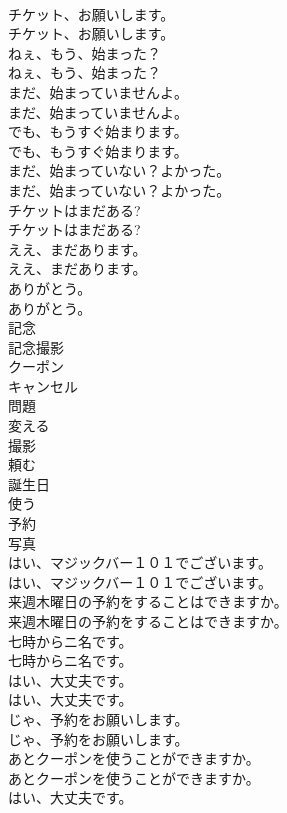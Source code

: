 \documentclass[8pt]{extreport}
\begin{document}
\begin{CJK}{UTF8}{min}
\\	チケット、お願いします。	
\\	チケット、お願いします。 
\\	ねぇ、もう、始まった？	
\\	ねぇ、もう、始まった？ 
\\	まだ、始まっていませんよ。	
\\	まだ、始まっていませんよ。 
\\	でも、もうすぐ始まります。	
\\	でも、もうすぐ始まります。 
\\	まだ、始まっていない？よかった。	
\\	まだ、始まっていない？よかった。 
\\	チケットはまだある?	
\\	チケットはまだある? 
\\	ええ、まだあります。	
\\	ええ、まだあります。 
\\	ありがとう。	
\\	ありがとう。 
\\	記念
\\	記念撮影
\\	クーポン
\\	キャンセル
\\	問題
\\	変える
\\	撮影
\\	頼む
\\	誕生日
\\	使う
\\	予約
\\	写真
\\	はい、マジックバー１０１でございます。	
\\	はい、マジックバー１０１でございます。 
\\	来週木曜日の予約をすることはできますか。	
\\	来週木曜日の予約をすることはできますか。 
\\	七時からニ名です。	
\\	七時からニ名です。 
\\	はい、大丈夫です。	
\\	はい、大丈夫です。 
\\	じゃ、予約をお願いします。	
\\	じゃ、予約をお願いします。 
\\	あとクーポンを使うことができますか。	
\\	あとクーポンを使うことができますか。 
\\	はい、大丈夫です。	

\end{CJK}
\end{document}
